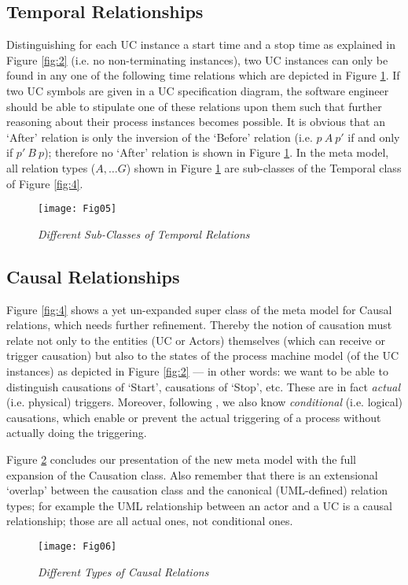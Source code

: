 \subsection{Temporal Relationships}

Distinguishing for each UC instance a start time and a stop time as 
explained in Figure \ref{fig:2} (i.e. no non-terminating instances), 
two UC instances can only be found in any one of the following time
relations which are depicted in Figure \ref{fig:5}. If two UC symbols 
are given in a UC specification diagram, the software engineer should 
be able to stipulate one of these relations upon them such that further 
reasoning about their process instances becomes possible. It is obvious 
that an `After' relation is only the inversion of the `Before' relation 
(i.e. $p~A~p'$ if and only if $p'~B~p$); therefore no `After' relation 
is shown in Figure \ref{fig:5}. In the meta model, all relation types 
($A, \ldots G$) shown in Figure \ref{fig:5} are sub-classes of the 
Temporal class of Figure \ref{fig:4}. 
\begin{figure}[t]
\begin{center}
\texttt{[image: Fig05]}\\   
\caption{\it Different Sub-Classes of Temporal Relations}
\label{fig:5} 
\end{center} 
\end{figure}

\subsection{Causal Relationships}

Figure \ref{fig:4} shows a yet un-expanded super class of the meta model 
for Causal relations, which needs further refinement. Thereby the notion 
of causation must relate not only to the entities (UC or Actors) themselves 
(which can receive or trigger causation) but also to the states of the 
process machine model (of the UC instances) as depicted in Figure \ref{fig:2} 
--- in other words: we want to be able to distinguish causations of `Start', 
causations of `Stop', etc. These are in fact \emph{actual} (i.e. physical) 
triggers. Moreover, following \cite{KGu04}, we also know \emph{conditional} 
(i.e. logical) causations, which enable or prevent the actual triggering of
a process without actually doing the triggering. 

Figure \ref{fig:6} concludes our presentation of the new meta model with 
the full expansion of the Causation class. Also remember that there is 
an extensional `overlap' between the causation class and the canonical 
(UML-defined) relation types; for example the UML relationship between 
an actor and a UC is a causal relationship; those are all actual ones, 
not conditional ones.
\begin{figure}[t!]
\begin{center}
\texttt{[image: Fig06]}\\   
\caption{\it Different Types of Causal Relations}
\label{fig:6} 
\end{center} 
\end{figure}

